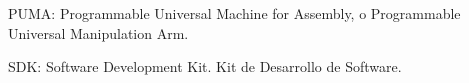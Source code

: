 PUMA: Programmable Universal Machine for Assembly, o Programmable Universal Manipulation Arm.

SDK: Software Development Kit. Kit de Desarrollo de Software.